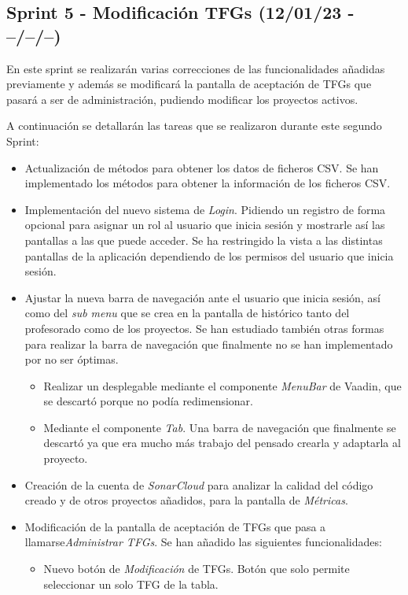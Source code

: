 \subsection{Sprint 5 - Modificación TFGs (12/01/23 - --/--/--) }

En este sprint se realizarán varias correcciones de las funcionalidades añadidas previamente y además se modificará la pantalla de aceptación de TFGs que pasará a ser de administración, pudiendo modificar los proyectos activos.

A continuación se detallarán las tareas que se realizaron durante este segundo Sprint:

\begin{itemize}
	\item Actualización de métodos para obtener los datos de ficheros CSV. Se han implementado los métodos para obtener la información de los ficheros CSV.
	\item Implementación del nuevo sistema de \emph{Login}. Pidiendo un registro de forma opcional para asignar un rol al usuario que inicia sesión y mostrarle así las pantallas a las que puede acceder. Se ha restringido la vista a las distintas pantallas de la aplicación dependiendo de los permisos del usuario que inicia sesión.
	\item Ajustar la nueva barra de navegación ante el usuario que inicia sesión, así como del \emph{sub menu} que se crea en la pantalla de histórico tanto del profesorado como de los proyectos. Se han estudiado también otras formas para realizar la barra de navegación que finalmente no se han implementado por no ser óptimas.
	\begin{itemize}
		\item Realizar un desplegable mediante el componente \emph{MenuBar} de Vaadin, que se descartó porque no podía redimensionar.
		\item Mediante el componente \emph{Tab}. Una barra de navegación que finalmente se descartó ya que era mucho más trabajo del pensado crearla y adaptarla al proyecto.
	\end{itemize}		
	\item Creación de la cuenta de \emph{SonarCloud} para analizar la calidad del código creado y de otros proyectos añadidos, para la pantalla de \emph{Métricas}.
	\item Modificación de la pantalla de aceptación de TFGs que pasa a llamarse\emph{Administrar TFGs}. Se han añadido las siguientes funcionalidades:
	\begin{itemize}
		\item Nuevo botón de \emph{Modificación} de TFGs. Botón que solo permite seleccionar un solo TFG de la tabla.

\end{itemize}
\end{itemize}
